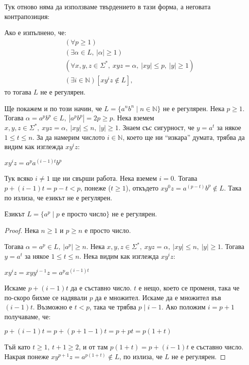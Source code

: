 Тук отново няма да използваме твърдението в тази форма, а неговата контрапозиция:

\begin{corollary}
    Ако е изпълнено, че:
    \begin{align*}
         & (\forall p \geq 1)                                                             \\
         & (\exists \alpha \in L, \: |\alpha| \geq 1)                                     \\
         & (\forall x, y, z \in \Sigma^*, \: xyz = \alpha, \: |xy| \leq p, \: |y| \geq 1) \\
         & (\exists i \in \mathbb{N}) [xy^iz \notin L],
    \end{align*}
    то тогава $L$ не е регулярен.
\end{corollary}

Ще покажем и по този начин, че $L = \{ a^nb^n \mid n \in \mathbb{N} \}$ не е регулярен.
Нека $p \geq 1$.
Тогава $\alpha = a^pb^p \in L, \: |a^pb^p| = 2p \geq p$.
Нека вземем $x, y, z \in \Sigma^*, \: xyz = \alpha, \: |xy| \leq n, \: |y| \geq 1$.
Знаем със сигурност, че $y = a^t$ за някое $1 \leq t \leq n$.
За да намерим числото $i \in \mathbb{N}$, което ще ни ``изкара'' думата, трябва да видим как изглежда $xy^iz$:
\begin{center}
    $xy^iz = a^pa^{(i - 1)t}b^p$
\end{center}
Тук всяко $i \neq 1$ ще ни свърши работа.
Нека вземем $i = 0$.
Тогава $p + (i - 1)t = p - t < p$, понеже ($t \geq 1$), откъдето $xy^0z = a^{(p - t)}b^p \notin L$.
Така по  излиза, че езикът не е регулярен.

\begin{claim}
    Езикът $L = \{ a^p \mid p \text{ е просто число} \}$ не е регулярен.
\end{claim}

\begin{proof}
    Нека $n \geq 1$ и $p \geq n$ е просто число.

    Тогава $\alpha = a^p \in L, \: |a^p| \geq n$.
    Нека $x, y, z \in \Sigma^*, \: xyz = \alpha, \: |xy| \leq n, \: |y| \geq 1$.
    Тогава $y = a^t$ за някое $1 \leq t \leq n$.
    Нека видим как изглежда $xy^iz$:
    \begin{center}
        $xy^iz = xyy^{i - 1}z = a^pa^{(i - 1)t}$
    \end{center}
    Искаме $p + (i - 1)t$ да е съставно число.
    $t$ е нещо, което се променя, така че по-скоро бихме се надявали $p$ да е множител.
    Искаме да е множител във $(i - 1)t$. Възможно е $t < p$, така че трябва $p \mid i - 1$.
    Ако положим $i = p + 1$ получаваме, че:
    \begin{center}
        $p + (i - 1)t = p + (p + 1 - 1)t = p + pt = p(1 + t)$
    \end{center}
    Тъй като $t \geq 1, \: t + 1 \geq 2$, и от там $p(1 + t) = p + (i - 1)t$ е съставно число.
    Накрая понеже $xy^{p + 1}z = a^{p(1 + t)} \notin L$, по  излиза, че $L$ не е регулярен.
\end{proof}

